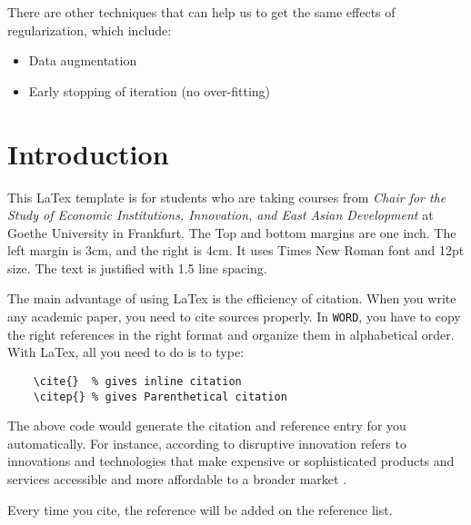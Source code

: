 \documentclass[12pt]{article}
\theoremstyle{definition}
\numberwithin{equation}{section}
\begin{document}
There are other techniques that can help us to get the same effects of regularization, which include:
\begin{itemize}
	\item Data augmentation 
	\item Early stopping of iteration (no over-fitting)
\end{itemize}


\newpage
{}
\setcounter{tocdepth}{2}
\tableofcontents
\listoffigures
\listoftables



\newpage
{}
\setcounter{page}{1}
\section{Introduction}

This LaTex template is for students who are taking courses from \textit{Chair
for the Study of Economic Institutions, Innovation, and East Asian Development}
at Goethe University in Frankfurt. The Top and bottom margins are one inch. The left
margin is 3cm, and the right is 4cm. It uses Times New Roman font and 12pt size.
The text is justified with 1.5 line spacing. 

The main advantage of using LaTex is the efficiency of citation. When you write
any academic paper, you need to cite sources properly. In \texttt{WORD}, you have
to copy the right references in the right format and organize them in alphabetical
order. With LaTex, all you need to do is to type:
\begin{lstlisting}
    \cite{}  % gives inline citation
    \citep{} % gives Parenthetical citation
\end{lstlisting}

The above code would generate the citation and reference entry for you automatically.
For instance, according to \cite{christensen2013disruptive} disruptive innovation
refers to innovations and technologies that make expensive or sophisticated 
products and services accessible and more affordable to a broader market \citep{greenwade93}.

Every time you cite, the reference will be added on the reference list.
\end{document}

